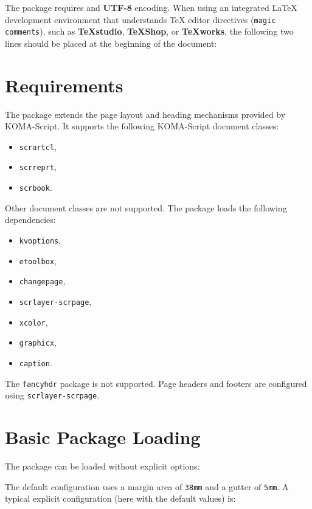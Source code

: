 \documentclass[
11pt,
a4paper,
oneside
]{scrbook}
\begin{document}
The \MDWordmark package requires \LuaLaTeX{} and \textbf{UTF-8}
encoding. When using an integrated \LaTeX{} development environment that
understands \TeX{} editor directives (\texttt{magic comments}), such
as \textbf{TeXstudio}, \textbf{\TeX Shop}, or \textbf{\TeX works},
the following two lines should be placed at the beginning of the
document:





\section{Requirements}

The \MDWordmark package extends the page layout and heading mechanisms
provided by KOMA-Script.
It supports the following KOMA-Script document classes:

\begin{itemize}
	\item \texttt{scrartcl},
	\item \texttt{scrreprt},
	\item \texttt{scrbook}.
\end{itemize}
Other document classes are not supported.
The package loads the following dependencies:
\begin{itemize}
	\item \texttt{kvoptions},
	\item \texttt{etoolbox},
	\item \texttt{changepage},
	\item \texttt{scrlayer-scrpage},
	\item \texttt{xcolor},
	\item \texttt{graphicx},
	\item \texttt{caption}.
\end{itemize}
The \texttt{fancyhdr} package is not supported.
Page headers and footers are configured using
\texttt{scrlayer-scrpage}.

\section{Basic Package Loading}

The package can be loaded without explicit options:




The default configuration uses a margin area of \texttt{38mm} and a gutter
of \texttt{5mm}.
A typical explicit configuration (here with the default values) is:
\end{document}
